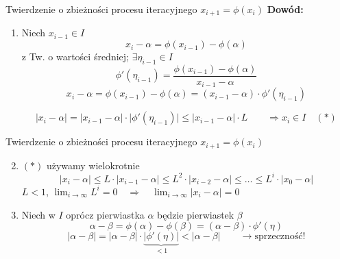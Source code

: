 \begin{frame}{Twierdzenie o zbieżności procesu iteracyjnego $x_{i+1} = \phi(x_{i})$}
	\textbf{Dowód:}
	\begin{enumerate}
		\item Niech $x_{i-1} \in I$\\
		\[
			x_{i} - \alpha = \phi(x_{i-1}) - \phi(\alpha)
		\]
		z Tw. o wartości średniej; $ \exists \eta_{i-1} \in I$
		\[
			\phi'(\eta_{i-1})=
		 \frac{\phi(x_{i-1}) - \phi(\alpha)}{ x_{i-1} - \alpha }
		\]
		\[
			x_{i} - \alpha = \phi(x_{i-1}) - \phi(\alpha) = (x_{i-1} - \alpha) \cdot \phi'(\eta_{i-1})
		\]
		
		\[
			\lvert x_{i} - \alpha \rvert = \lvert x_{i-1} - \alpha \rvert \cdot \lvert \phi'(\eta_{i-1}) \rvert \leq \lvert x_{i-1} - \alpha \rvert \cdot L \qquad \Rightarrow x_{i} \in I \quad(*)
		\]
			\end{enumerate}
\end{frame}
\begin{frame}{Twierdzenie o zbieżności procesu iteracyjnego $x_{i+1} = \phi(x_{i})$}
	\begin{enumerate}
		\setcounter{enumi}{1}
		\item $(*)$ używamy wielokrotnie
		\[
			\lvert x_{i} - \alpha \rvert \leq L \cdot \lvert x_{i-1} - \alpha \rvert \leq L^{2} \cdot \lvert x_{i-2} - \alpha \rvert \leq \ldots \leq L^{i} \cdot \lvert x_{0} - \alpha \rvert
		\]
		$L < 1$, $\lim_{i \rightarrow \infty} L^{i} = 0 \quad \Rightarrow \quad \lim_{i \rightarrow \infty} \lvert x_{i} - \alpha \rvert = 0$
		\vspace{0.5cm}
		\item Niech w $I$ oprócz pierwiastka $\alpha$ będzie pierwiastek $\beta$
		\[
			\alpha - \beta = \phi(\alpha) - \phi(\beta) = (\alpha - \beta) \cdot \phi'(\eta)
		\]
		\[
			\lvert \alpha - \beta \rvert = \lvert \alpha - \beta \rvert \cdot \underbrace{\lvert \phi'(\eta) \rvert}_{< 1} < \lvert \alpha - \beta \rvert \qquad \rightarrow \text{sprzeczność!}
		\]
		
		\]
	\end{enumerate}
\end{frame}
